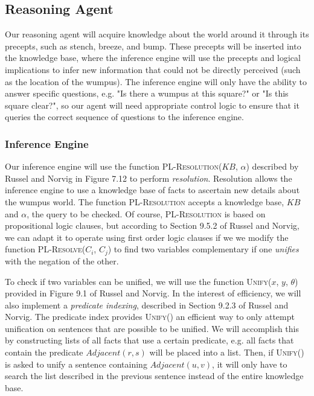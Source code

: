 \documentclass{article}
\begin{document}
		\subsection{Reasoning Agent}
		\label{reason}
		
			Our reasoning agent will acquire knowledge about the world around it through its precepts, such as stench, breeze, and bump. These precepts will be inserted into the knowledge base, where the inference engine will use the precepts and logical implications to infer new information that could not be directly perceived (such as the location of the wumpus). The inference engine will only have the ability to answer specific questions, e.g. "Is there a wumpus at this square?" or "Is this square clear?", so our agent will need appropriate control logic to ensure that it queries the correct sequence of questions to the inference engine.  
		
			\subsubsection{Inference Engine}
			\label{inference}
			
				Our inference engine will use the function \textsc{PL-Resolution}($KB$, $\alpha$) described by Russel and Norvig in Figure 7.12 \cite{ai} to perform \textit{resolution}. 
				Resolution allows the inference engine to use a knowledge base of facts to ascertain new details about the wumpus world. 
				The function \textsc{PL-Resolution} accepts a knowledge base, $KB$ and $\alpha$, the query to be checked. Of course, \textsc{PL-Resolution} is based on propositional logic clauses, but according to Section 9.5.2 of Russel and Norvig, we can adapt it to operate using first order logic clauses if we we modify the function \textsc{PL-Resolve($C_i$, $C_j$)} to find two variables complementary if one \textit{unifies} with the negation of the other. 
				
				To check if two variables can be unified, we will use the function \textsc{Unify}($x$, $y$, $\theta$) provided in Figure 9.1 of Russel and Norvig.
				In the interest of efficiency, we will also implement a \textit{predicate indexing}, described in Section 9.2.3 of Russel and Norvig\cite{ai}.
				The predicate index provides \textsc{Unify}() an efficient way to only attempt unification on sentences that are possible to be unified. 
				We will accomplish this by constructing lists of all facts that use a certain predicate, e.g. all facts that contain the predicate $Adjacent(r,s)$ will be placed into a list.
				Then, if \textsc{Unify()} is asked to unify a sentence containing $Adjacent(u,v)$, it will only have to search the list described in the previous sentence instead of the entire knowledge base.
				
\end{document}
